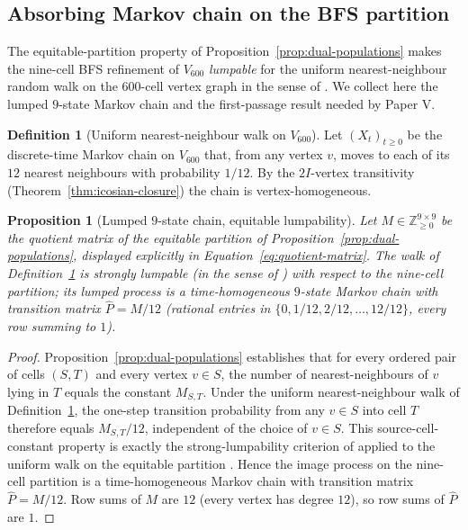 \documentclass[11pt, a4paper]{amsart}
\newtheorem{proposition}[theorem]{Proposition}
\theoremstyle{definition}
\newtheorem{definition}[theorem]{Definition}
\newcommand{\Z}{\mathbb{Z}}
\begin{document}
\subsection{Absorbing Markov chain on the BFS partition}
\label{sec:markov-600}

The equitable-partition property of
Proposition~\ref{prop:dual-populations} makes the nine-cell BFS
refinement of $V_{600}$ \emph{lumpable} for the uniform nearest-neighbour
random walk on the $600$-cell vertex graph in the sense of
\cite[Ch.~V]{KemenySnell1976}. We collect here the lumped
$9$-state Markov chain and the first-passage result needed by Paper
V.

\begin{definition}[Uniform nearest-neighbour walk on $V_{600}$]
\label{def:markov-600}
Let $(X_t)_{t \geq 0}$ be the discrete-time Markov chain on
$V_{600}$ that, from any vertex $v$, moves to each of its $12$
nearest neighbours with probability $1/12$. By the $2I$-vertex
transitivity (Theorem~\ref{thm:icosian-closure}) the chain is
vertex-homogeneous.
\end{definition}

\begin{proposition}[Lumped $9$-state chain, equitable lumpability]
\label{prop:lumped-markov}
Let $M \in \Z^{9 \times 9}_{\geq 0}$ be the quotient matrix of the
equitable partition of Proposition~\ref{prop:dual-populations},
displayed explicitly in Equation~\eqref{eq:quotient-matrix}. The
walk of Definition~\ref{def:markov-600} is strongly lumpable (in
the sense of \cite[Ch.~V]{KemenySnell1976}) with respect to the
nine-cell partition; its lumped process is a time-homogeneous
$9$-state Markov chain with transition matrix $\widehat P = M /
12$ (rational entries in $\{0, 1/12, 2/12, \ldots, 12/12\}$, every
row summing to $1$).
\end{proposition}

\begin{proof}
Proposition~\ref{prop:dual-populations} establishes that for every
ordered pair of cells $(S, T)$ and every vertex $v \in S$, the
number of nearest-neighbours of $v$ lying in $T$ equals the
constant $M_{S, T}$. Under the uniform nearest-neighbour walk of
Definition~\ref{def:markov-600}, the one-step transition
probability from any $v \in S$ into cell $T$ therefore equals
$M_{S, T} / 12$, independent of the choice of $v \in S$. This
source-cell-constant property is exactly the strong-lumpability
criterion of \cite[Thm.~V.5, Ch.~V]{KemenySnell1976} applied to
the uniform walk on the equitable partition
\cite[\S 9.3]{GodsilRoyle2001}. Hence the image process on the
nine-cell partition is a time-homogeneous Markov chain with
transition matrix $\widehat P = M / 12$. Row sums of $M$ are
$12$ (every vertex has degree $12$), so row sums of $\widehat P$
are $1$.
\end{proof}
\end{document}
